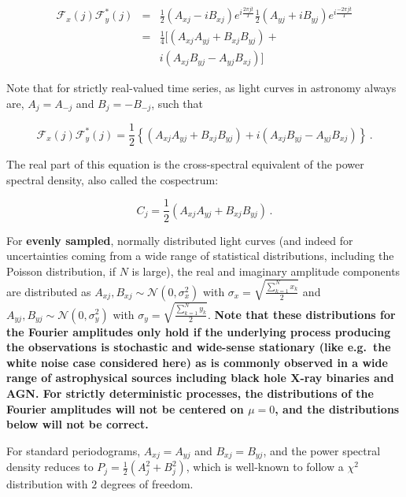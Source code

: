 \documentclass[12pt]{emulateapj}
\begin{document}
\begin{eqnarray}
\mathcal{F}_x(j) \mathcal{F}_y^*(j) & = & \frac{1}{2} (A_{xj} - i B_{xj}) e^{i \frac{2 \pi j t}{T}} \frac{1}{2} (A_{yj} + i B_{yj}) e^{i \frac{-2 \pi j t}{T}}\nonumber \\ 
		     & = & \frac{1}{4} [ (A_{xj}A_{yj} + B_{xj}B_{yj}) + \\\nonumber
		     & &  i (A_{xj}B_{yj} - A_{yj}B_{xj}) ]
\end{eqnarray}

Note that for strictly real-valued time series, as light curves in astronomy always are, $A_j = A_{-j}$ and $B_j = - B_{-j}$, such that 

\begin{equation}
\mathcal{F}_x(j) \mathcal{F}_y^*(j) = \frac{1}{2} \left\{ (A_{xj}A_{yj} + B_{xj}B_{yj}) + i (A_{xj}B_{yj} - A_{yj}B_{xj}) \right\} \, .
\end{equation}

\noindent The real part of this equation is the cross-spectral equivalent of the power spectral density, also called the cospectrum:

\begin{equation}
C_j = \frac{1}{2}  (A_{xj}A_{yj} + B_{xj}B_{yj}) \, .
\end{equation}

\noindent For \textbf{evenly sampled}, normally distributed light curves (and indeed for uncertainties coming from a wide range of statistical distributions, including the Poisson distribution, if $N$ is large), the real and imaginary amplitude components are distributed as $A_{xj}, B_{xj} \sim \mathcal{N}(0, \sigma_x^2)$ with $\sigma_x =  \sqrt{\frac{\sum_{k=1}^{N}{x_k}}{2}}$ and  $A_{yj}, B_{yj} \sim \mathcal{N}(0, \sigma_y^2)$ with $\sigma_y = \sqrt{\frac{\sum_{k=1}^{N}{y_k}}{2}}$. \textbf{Note that these distributions for the Fourier amplitudes only hold if the underlying process producing the observations is stochastic and wide-sense stationary (like e.g.\ the white noise case considered here) as is commonly observed in a wide range of astrophysical sources including black hole X-ray binaries and AGN. For strictly deterministic processes, the distributions of the Fourier amplitudes will not be centered on $\mu = 0$, and the distributions below will not be correct.}

For standard periodograms, $A_{xj} = A_{yj}$ and $B_{xj} = B_{yj}$, and the power spectral density reduces to $P_j = \frac{1}{2} (A_j^2 + B_j^2)$, which is well-known to follow a $\chi^2$ distribution with $2$ degrees of freedom. 
\end{document}
